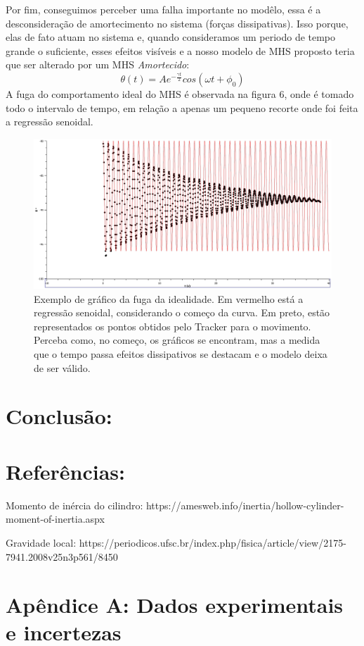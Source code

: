 \documentclass[hidelinks,a4paper,10pt]{article}
\begin{document}


\qquad Por fim, conseguimos perceber uma falha importante no modêlo, 
essa é a desconsideração de amortecimento no sistema (forças dissipativas). 
Isso porque, elas de fato atuam no sistema e, quando consideramos um periodo de tempo 
grande o suficiente, esses efeitos visíveis e a nosso modelo de MHS proposto teria que 
ser alterado por um MHS \textit{Amortecido}:
\begin{equation*}
    \theta (t) = A e^{-\frac{\gamma t}{2}}cos(\omega t + \phi_0)
\end{equation*}
\qquad A fuga do comportamento ideal do MHS é observada na figura 6, 
onde é tomado todo o intervalo de tempo, em relação a apenas um pequeno recorte 
onde foi feita a regressão senoidal.
\begin{figure}[h]
    \centering
    \includegraphics[width=0.4\linewidth]{grafico6.png}
    \caption{\small{Exemplo de gráfico da fuga da idealidade. Em vermelho está a regressão senoidal, considerando o começo da curva. 
    Em preto, estão representados os pontos obtidos pelo Tracker para o movimento. Perceba como, 
    no começo, os gráficos se encontram, mas a medida que o tempo passa efeitos dissipativos se destacam e o modelo deixa de ser válido.
    }}
    \label{fig:1.4}
\end{figure}



\section*{Conclusão:}

\section*{Referências:}
\begin{enumerate}
    \small
    {
    \item[1] Momento de inércia do cilindro: https://amesweb.info/inertia/hollow-cylinder-moment-of-inertia.aspx
    \item[2] Gravidade local: https://periodicos.ufsc.br/index.php/fisica/article/view/2175-7941.2008v25n3p561/8450
    }
\end{enumerate}

\section*{Apêndice A: Dados experimentais e incertezas}
\end{document}
